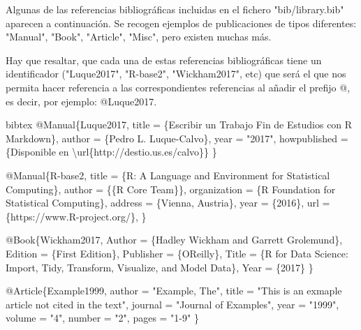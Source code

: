 \documentclass[11pt,a4paper,oneside,]{article}
\newenvironment{Shaded}{\begin{snugshade}}{\end{snugshade}}
\newcommand{\AttributeTok}[1]{\textcolor[rgb]{0.77,0.63,0.00}{#1}}
\newcommand{\FunctionTok}[1]{\textcolor[rgb]{0.00,0.00,0.00}{#1}}
\newcommand{\NormalTok}[1]{#1}
\newcommand{\SpecialCharTok}[1]{\textcolor[rgb]{0.00,0.00,0.00}{#1}}
\newcommand{\StringTok}[1]{\textcolor[rgb]{0.31,0.60,0.02}{#1}}
\numberwithin{dummy}{section}
\theoremstyle{ocrenumbox}
\theoremstyle{blacknumex}
\theoremstyle{blacknumbox}
\theoremstyle{ocrenum}
\theoremstyle{ocrenum}
\begin{document}
\begin{Shaded}
\begin{Highlighting}[numbers=left,,firstnumber=1101,]
\NormalTok{Algunas de las referencias bibliográficas incluidas en el fichero }\StringTok{"bib/library.bib"}\NormalTok{ aparecen a continuación. Se recogen ejemplos de publicaciones de tipos diferentes}\SpecialCharTok{:} \StringTok{"Manual"}\NormalTok{, }\StringTok{"Book"}\NormalTok{, }\StringTok{"Article"}\NormalTok{, }\StringTok{"Misc"}\NormalTok{, pero existen muchas más.}

\NormalTok{Hay que resaltar, que cada una de estas referencias bibliográficas tiene un }\FunctionTok{identificador}\NormalTok{ (}\StringTok{"Luque2017"}\NormalTok{, }\StringTok{"R{-}base2"}\NormalTok{, }\StringTok{"Wickham2017"}\NormalTok{, etc) que será el que nos permita hacer referencia a las correspondientes referencias al añadir el prefijo }\StringTok{\textasciigrave{}}\AttributeTok{@}\StringTok{\textasciigrave{}}\NormalTok{, es decir, por ejemplo}\SpecialCharTok{:} \StringTok{\textasciigrave{}}\AttributeTok{@Luque2017}\StringTok{\textasciigrave{}}\NormalTok{.}

\StringTok{\textasciigrave{}\textasciigrave{}\textasciigrave{}}\AttributeTok{bibtex}
\AttributeTok{@Manual\{Luque2017,}
\AttributeTok{  title = \{Escribir un Trabajo Fin de Estudios con R Markdown\},}
\AttributeTok{  author = \{Pedro L. Luque{-}Calvo\},}
\AttributeTok{  year = "2017",}
\AttributeTok{  howpublished = \{Disponible en \textbackslash{}url\{http://destio.us.es/calvo\}\}}
\AttributeTok{\}}

\AttributeTok{@Manual\{R{-}base2,}
\AttributeTok{  title = \{R: A Language and Environment for Statistical}
\AttributeTok{    Computing\},}
\AttributeTok{  author = \{\{R Core Team\}\},}
\AttributeTok{  organization = \{R Foundation for Statistical Computing\},}
\AttributeTok{  address = \{Vienna, Austria\},}
\AttributeTok{  year = \{2016\},}
\AttributeTok{  url = \{https://www.R{-}project.org/\},}
\AttributeTok{\}}


\AttributeTok{@Book\{Wickham2017,}
\AttributeTok{    Author = \{Hadley Wickham and Garrett Grolemund\},}
\AttributeTok{    Edition = \{First Edition\},}
\AttributeTok{    Publisher = \{O\textquotesingle{}Reilly\},}
\AttributeTok{    Title = \{R for Data Science: Import, Tidy, Transform, }
\AttributeTok{    Visualize, and Model Data\},}
\AttributeTok{    Year = \{2017\}}
\AttributeTok{\}}

\AttributeTok{@Article\{Example1999,}
\AttributeTok{    author  = "Example, The",}
\AttributeTok{    title   = "This is an exmaple article not cited in the text",}
\AttributeTok{    journal = "Journal of Examples",}
\AttributeTok{    year    = "1999",}
\AttributeTok{    volume  = "4",}
\AttributeTok{    number  = "2",}
\AttributeTok{    pages   = "1{-}9"}
\AttributeTok{\}}


\end{Highlighting}
\end{Shaded}
\end{document}
